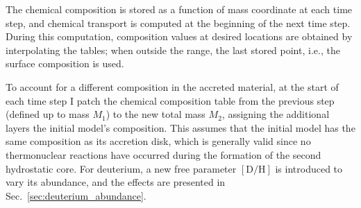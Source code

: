 \documentclass[12pt,a4paper]{article}
\newcommand{\mr}{\mathrm}
\begin{document}
The chemical composition is stored as a function of mass coordinate at each time step, and chemical transport is computed at the beginning of the next time step. During this computation, composition values at desired locations are obtained by interpolating the tables; when outside the range, the last stored point, i.e., the surface composition is used.

To account for a different composition in the accreted material, at the start of each time step I patch the chemical composition table from the previous step (defined up to mass $M_1$) to the new total mass $M_2$, assigning the additional layers the initial model's composition. This assumes that the initial model has the same composition as its accretion disk, which is generally valid since no thermonuclear reactions have occurred during the formation of the second hydrostatic core. For deuterium, a new free parameter $[\mr{D/H}]$ is introduced to vary its abundance, and the effects are presented in Sec.~\ref{sec:deuterium_abundance}.




\end{document}
